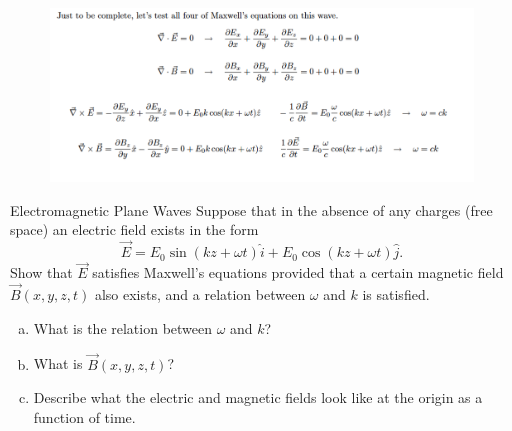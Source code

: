 \documentclass[makesolutionspdf]{esg8022pset}
\begin{document}
\begin{solution}
  \begin{figure}[H]
    \centering
    \includegraphics[width = 15cm]{solpu905a}
  \end{figure}
\end{solution}


\begin{problem}{Electromagnetic Plane Waves}
  Suppose that in the absence of any charges (free
  space) an electric field exists in the form
  $$\vec E = E_0\sin(kz + \omega t) \hat i + E_0 \cos(kz + \omega t) \hat j.$$
  Show that $\vec E$ satisfies Maxwell's equations provided that a certain magnetic field $\vec B(x,y,z,t)$
  also exists, and a relation between $\omega$ and $k$ is satisfied.
  \begin{enumerate}[(a)]
    \item What is the relation between $\omega$ and $k$?
    \item What is $\vec B(x,y,z,t)$?
    \item Describe what the electric and magnetic fields look like at the origin as a function of
    time.
  \end{enumerate}
\end{problem}
\end{document}

